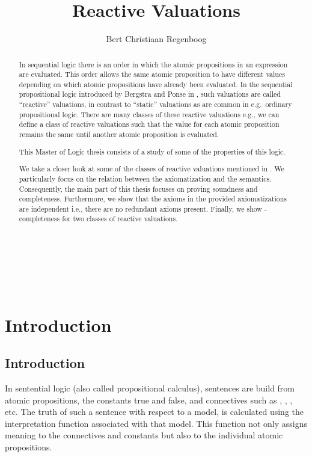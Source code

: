 \documentclass[a4paper,twoside,openright]{report}
\title{Reactive Valuations}
\author{Bert Christiaan Regenboog}
\begin{document}
\maketitle
\thispagestyle{empty}
~\newpage

\tableofcontents

\begin{abstract}
In sequential logic there is an order in which the atomic propositions
in an expression are evaluated. This order allows the same atomic proposition
to have different values depending on which atomic propositions have
already been evaluated. In the sequential propositional logic
introduced by Bergstra and Ponse in \cite{main}, such valuations are
called ``reactive'' valuations, in contrast to ``static'' valuations as
are common in e.g.\ ordinary propositional logic. There are many
classes of these reactive valuations e.g., we can define a class of
reactive valuations such that the value for each atomic proposition
remains the same until another atomic proposition is evaluated.

This Master of Logic thesis consists of a study of some of the properties of
this logic.

We take a closer look at some of the classes of reactive valuations mentioned in \cite{main}. We particularly focus on the relation between the axiomatization and the semantics. Consequently, the main part of this thesis focuses on proving soundness and completeness. Furthermore, we show that the axioms in the provided axiomatizations are independent i.e., there are no redundant axioms present. Finally, we show -completeness for two classes of reactive valuations.

\end{abstract}

\thispagestyle{empty}
~\newpage


\chapter{Introduction}

\section{Introduction}
In sentential logic (also called propositional calculus), sentences are build from atomic propositions, the constants true and false, and connectives such as , , , etc. The truth of such a sentence with respect to a model, is calculated using the interpretation function associated with that model. This function not only assigns meaning to the connectives and constants but also to the individual atomic propositions.
\end{document}

